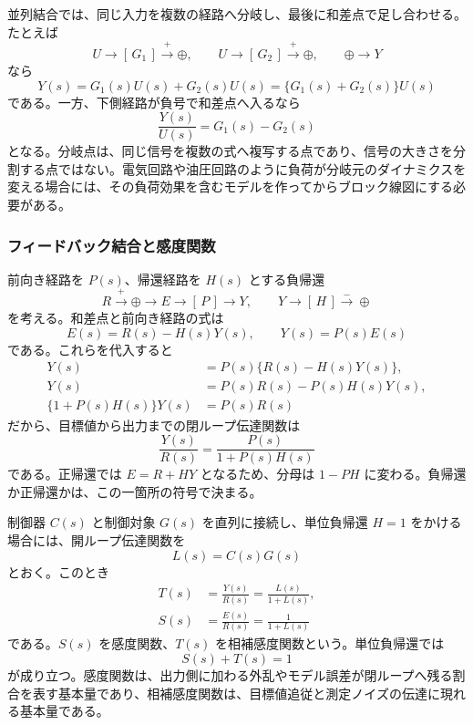並列結合では、同じ入力を複数の経路へ分岐し、最後に和差点で足し合わせる。たとえば
\[
  U \longrightarrow [\,G_1\,] \stackrel{+}{\longrightarrow} \oplus,
  \qquad
  U \longrightarrow [\,G_2\,] \stackrel{+}{\longrightarrow} \oplus,
  \qquad
  \oplus \longrightarrow Y
\]
なら
\begin{equation}
  Y(s)=G_1(s)U(s)+G_2(s)U(s)
  =\{G_1(s)+G_2(s)\}U(s)
  \label{eq:parallel-interconnection}
\end{equation}
である。一方、下側経路が負号で和差点へ入るなら
\begin{equation}
  \frac{Y(s)}{U(s)}=G_1(s)-G_2(s)
\end{equation}
となる。分岐点は、同じ信号を複数の式へ複写する点であり、信号の大きさを分割する点ではない。電気回路や油圧回路のように負荷が分岐元のダイナミクスを変える場合には、その負荷効果を含むモデルを作ってからブロック線図にする必要がある。

\subsubsection{フィードバック結合と感度関数}

前向き経路を $P(s)$、帰還経路を $H(s)$ とする負帰還
\[
  R \stackrel{+}{\longrightarrow}\oplus\longrightarrow E
  \longrightarrow [\,P\,]\longrightarrow Y,\qquad
  Y\longrightarrow [\,H\,]\stackrel{-}{\longrightarrow}\oplus
\]
を考える。和差点と前向き経路の式は
\begin{equation}
  E(s)=R(s)-H(s)Y(s),\qquad
  Y(s)=P(s)E(s)
\end{equation}
である。これらを代入すると
\begin{align}
  Y(s)&=P(s)\{R(s)-H(s)Y(s)\},\\
  Y(s)&=P(s)R(s)-P(s)H(s)Y(s),\\
  \{1+P(s)H(s)\}Y(s)&=P(s)R(s)
\end{align}
だから、目標値から出力までの閉ループ伝達関数は
\begin{equation}
  \frac{Y(s)}{R(s)}
  =
  \frac{P(s)}{1+P(s)H(s)}
  \label{eq:feedback-general}
\end{equation}
である。正帰還では $E=R+HY$ となるため、分母は $1-PH$ に変わる。負帰還か正帰還かは、この一箇所の符号で決まる。

制御器 $C(s)$ と制御対象 $G(s)$ を直列に接続し、単位負帰還 $H=1$ をかける場合には、開ループ伝達関数を
\begin{equation}
  L(s)=C(s)G(s)
\end{equation}
とおく。このとき
\begin{align}
  T(s)&=\frac{Y(s)}{R(s)}
  =\frac{L(s)}{1+L(s)},
  \label{eq:closed-loop}\\
  S(s)&=\frac{E(s)}{R(s)}
  =\frac{1}{1+L(s)}
  \label{eq:sensitivity-complementary}
\end{align}
である。$S(s)$ を感度関数、$T(s)$ を相補感度関数という。単位負帰還では
\begin{equation}
  S(s)+T(s)=1
\end{equation}
が成り立つ。感度関数は、出力側に加わる外乱やモデル誤差が閉ループへ残る割合を表す基本量であり、相補感度関数は、目標値追従と測定ノイズの伝達に現れる基本量である。

